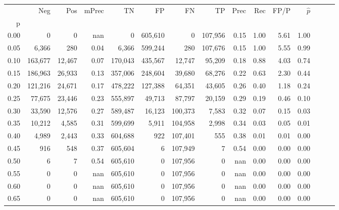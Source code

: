 \begin{tabular}{rrrrrrrrrrrrrrr}
\toprule
{} &      Neg &     Pos & mPrec &       TN &       FP &       FN &       TP &  Prec &   Rec &  FP/P & $\hat{p}$ \\
p    &          &         &       &          &          &          &          &       &       &       &           \\
\midrule
0.00 &        0 &       0 &   nan &        0 &  605,610 &        0 &  107,956 &  0.15 &  1.00 &  5.61 &      1.00 \\
0.05 &    6,366 &     280 &  0.04 &    6,366 &  599,244 &      280 &  107,676 &  0.15 &  1.00 &  5.55 &      0.99 \\
0.10 &  163,677 &  12,467 &  0.07 &  170,043 &  435,567 &   12,747 &   95,209 &  0.18 &  0.88 &  4.03 &      0.74 \\
0.15 &  186,963 &  26,933 &  0.13 &  357,006 &  248,604 &   39,680 &   68,276 &  0.22 &  0.63 &  2.30 &      0.44 \\
0.20 &  121,216 &  24,671 &  0.17 &  478,222 &  127,388 &   64,351 &   43,605 &  0.26 &  0.40 &  1.18 &      0.24 \\
0.25 &   77,675 &  23,446 &  0.23 &  555,897 &   49,713 &   87,797 &   20,159 &  0.29 &  0.19 &  0.46 &      0.10 \\
0.30 &   33,590 &  12,576 &  0.27 &  589,487 &   16,123 &  100,373 &    7,583 &  0.32 &  0.07 &  0.15 &      0.03 \\
0.35 &   10,212 &   4,585 &  0.31 &  599,699 &    5,911 &  104,958 &    2,998 &  0.34 &  0.03 &  0.05 &      0.01 \\
0.40 &    4,989 &   2,443 &  0.33 &  604,688 &      922 &  107,401 &      555 &  0.38 &  0.01 &  0.01 &      0.00 \\
0.45 &      916 &     548 &  0.37 &  605,604 &        6 &  107,949 &        7 &  0.54 &  0.00 &  0.00 &      0.00 \\
0.50 &        6 &       7 &  0.54 &  605,610 &        0 &  107,956 &        0 &   nan &  0.00 &  0.00 &      0.00 \\
0.55 &        0 &       0 &   nan &  605,610 &        0 &  107,956 &        0 &   nan &  0.00 &  0.00 &      0.00 \\
0.60 &        0 &       0 &   nan &  605,610 &        0 &  107,956 &        0 &   nan &  0.00 &  0.00 &      0.00 \\
0.65 &        0 &       0 &   nan &  605,610 &        0 &  107,956 &        0 &   nan &  0.00 &  0.00 &      0.00 \\

\end{tabular}
